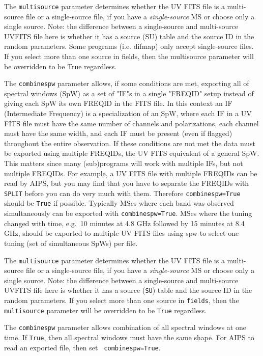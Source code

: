 The {\tt multisource} parameter determines whether the UV FITS file is
a multi-source file or a single-source file, if you have a
{\it single-source} MS or choose only a single source.  Note: the difference
between a single-source and multi-source UVFITS file here is whether
it has a source (SU) table and the source ID in the random parameters.
Some programs (i.e. difmap) only accept single-source files.  If you
select more than one source in fields, then the multisource parameter
will be overridden to be True regardless.

The {\tt combinespw} parameter allows, if some conditions are met,
exporting all of spectral windows (SpW) as a set of "IF"s in a single
"FREQID" setup instead of giving each SpW its own FREQID in the FITS
file.  In this context an IF (Intermediate Frequency) is a
specialization of an SpW, where each IF in a UV FITS file must have
the same number of channels and polarizations, each channel must have
the same width, and each IF must be present (even if flagged)
throughout the entire observation.  If these conditions are not met
the data must be exported using multiple FREQIDs, the UV FITS
equivalent of a general SpW.  This matters since many (sub)programs
will work with multiple IFs, but not multiple FREQIDs.  For example, a
UV FITS file with multiple FREQIDs can be read by AIPS, but you may
find that you have to separate the FREQIDs with {\tt SPLIT} before you
can do very much with them.  Therefore {\tt combinespw=True} should be
{\tt True} if possible.  Typically MSes where each band was observed
simultaneously can be exported with {\tt combinespw=True}.  MSes where the
tuning changed with time, e.g.\ 10 minutes at 4.8 GHz followed by 15
minutes at 8.4 GHz, should be exported to multiple UV FITS files using
spw to select one tuning (set of simultaneous SpWs) per file.



The {\tt multisource} parameter determines whether the UV FITS file is
a multi-source file or a single-source file, if you have a 
{\em single-source} MS or choose only a single source.  Note: the
difference between a single-source and multi-source UVFITS file here
is whether it has a source ({\tt SU}) table and the source ID in the
random parameters.  If you select more than one source in 
{\tt fields}, then the {\tt multisource} parameter will be overridden
to be {\tt True} regardless.

The {\tt combinespw} parameter allows combination of all spectral
windows at one time.  If {\tt True}, then all spectral windows must
have the same shape.  For AIPS to read an exported file, then set {\tt
combinespw=True}.

